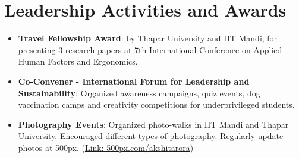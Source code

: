 \documentclass[letterpaper,11pt]{article}
\newcommand{\resumeItem}[2]{
  \item\small{
    \textbf{#1}{: #2 \vspace{-2pt}}
  }
}
\newcommand{\resumeSubItem}[2]{\resumeItem{#1}{#2}\vspace{-4pt}}
\newcommand{\resumeSubHeadingListStart}{\begin{itemize}[leftmargin=*]}
\newcommand{\resumeSubHeadingListEnd}{\end{itemize}}
\begin{document}
\section{Leadership Activities and Awards}
  \resumeSubHeadingListStart
  \resumeSubItem{Travel Fellowship Award}
      {by Thapar University and IIT Mandi; for presenting 3 research papers at 7th International Conference on Applied Human Factors and Ergonomics.}
  \resumeSubItem{Co-Convener - International Forum for Leadership and Sustainability}
    {Organized awareness campaigns, quiz events, dog vaccination camps and creativity competitions for underprivileged students.}
    \resumeSubItem{Photography Events}
      {Organized photo-walks in IIT Mandi and Thapar University. Encouraged different types of photography. Regularly update photos at 500px. (\href{https://500px.com/akshitarora}{Link: 500px.com/akshitarora})}
      
  \resumeSubHeadingListEnd

\end{document}
